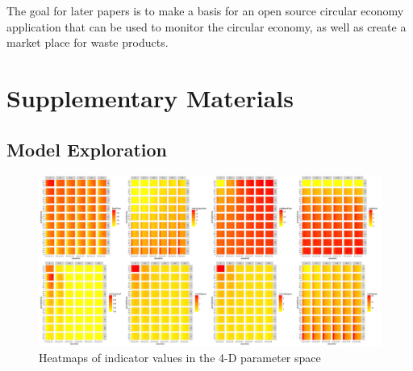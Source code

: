 \documentclass[fleqn,10pt]{wlscirep}
\begin{document}
{The goal for later papers is to make a basis for an open source circular economy application that can be used to monitor the circular economy, as well as create a market place for waste products.



















%








\newpage


\section*{Supplementary Materials}


\subsection*{Model Exploration}


\begin{figure}
\hspace{-2cm}\includegraphics[width=1.3\textwidth]{figures/heatmap_indics}
\caption{Heatmaps of indicator values in the 4-D parameter space}
\label{fig:heatmap}
\end{figure}


}
\end{document}
